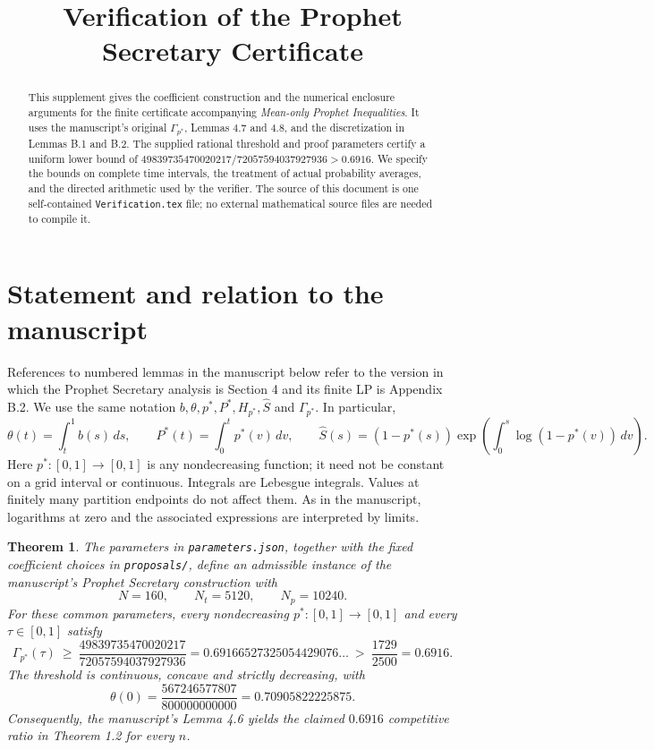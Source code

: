\documentclass[11pt,a4paper]{article}
\title{Verification of the Prophet Secretary Certificate}
\author{}
\date{}
\newtheorem{theorem}{Theorem}
\begin{document}
\maketitle
\begin{abstract}
This supplement gives the coefficient construction and the numerical enclosure
arguments for the finite certificate accompanying \emph{Mean-only Prophet Inequalities}. It uses the manuscript's original
$\Gamma_{p^*}$, Lemmas 4.7 and 4.8, and the discretization in Lemmas B.1 and B.2.
The supplied rational threshold and proof parameters certify a uniform lower
bound of $49839735470020217/72057594037927936>0.6916$.
We specify the bounds on complete time intervals, the treatment of actual
probability averages, and the directed arithmetic used by the verifier.
The source of this document is one self-contained \texttt{Verification.tex}
file; no external mathematical source files are needed to compile it.
\end{abstract}

\section{Statement and relation to the manuscript}
References to numbered lemmas in the manuscript below refer to the version in
which the Prophet Secretary analysis is Section 4 and its finite LP is
Appendix B.2. We use the same notation $b,\theta,p^*,P^*,H_{p^*},\widehat S$
and $\Gamma_{p^*}$. In particular,
\[
 \theta(t)=\int_t^1 b(s)\,ds,\qquad
 P^*(t)=\int_0^t p^*(v)\,dv,
 \qquad
 \widehat S(s)=(1-p^*(s))
       \exp\!\left(\int_0^s\log(1-p^*(v))\,dv\right).
\]
Here $p^*:[0,1]\to[0,1]$ is any nondecreasing function; it need not be
constant on a grid interval or continuous. Integrals are Lebesgue integrals.
Values at finitely many partition endpoints do not affect them. As in the
manuscript, logarithms at zero and the associated expressions are interpreted
by limits.

\begin{theorem}\label{thm:certificate}
The parameters in \texttt{parameters.json}, together with the fixed coefficient
choices in \texttt{proposals/}, define an admissible instance of the manuscript's
Prophet Secretary construction with
\[
 N=160,\qquad N_t=5120,\qquad N_p=10240.
\]
For these common parameters, every nondecreasing $p^*:[0,1]\to[0,1]$ and
every $\tau\in[0,1]$ satisfy
\begin{equation}\label{eq:certified}
 \Gamma_{p^*}(\tau)\ \ge\
 \frac{49839735470020217}{72057594037927936}
 =0.69166527325054429076\ldots\ >\ \frac{1729}{2500}=0.6916.
\end{equation}
The threshold is continuous, concave and strictly decreasing, with
\[
 \theta(0)=\frac{567246577807}{800000000000}
          =0.70905822225875.
\]
Consequently, the manuscript's Lemma 4.6 yields the claimed $0.6916$
competitive ratio in Theorem 1.2 for every $n$.
\end{theorem}
\end{document}
